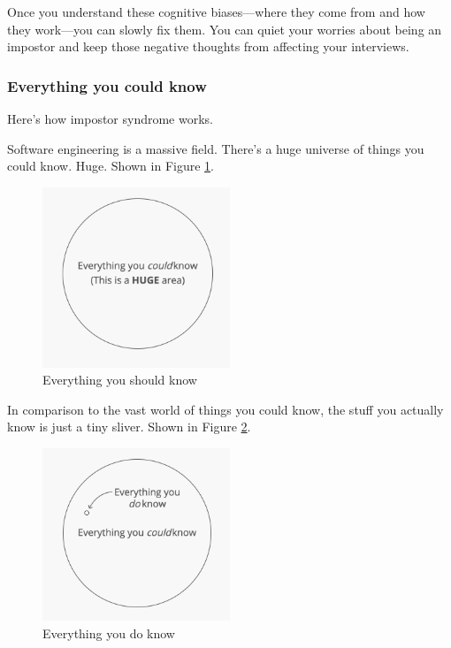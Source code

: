 \documentclass{article}
\begin{document}
Once you understand these cognitive biases—where they come from and how they work—you can slowly fix them. You can quiet your worries about being an impostor and keep those negative thoughts from affecting your interviews.


\subsubsection{Everything you could know}

Here’s how impostor syndrome works.

Software engineering is a massive field. There’s a huge universe of things you could know. Huge. Shown in Figure \ref{fig:you-could-know}.

\begin{figure}[!ht]
  \centering
  \includegraphics[width=0.5\textwidth]{pics/you-could-know}
  \caption{Everything you should know}
  \label{fig:you-could-know}
\end{figure}


In comparison to the vast world of things you could know, the stuff you actually know is just a tiny sliver. Shown in Figure \ref{fig:you-do-know}.

\begin{figure}[!ht]
  \centering
  \includegraphics[width=0.5\textwidth]{pics/you-do-know}
  \caption{Everything you do know}
  \label{fig:you-do-know}
\end{figure}
\end{document}
